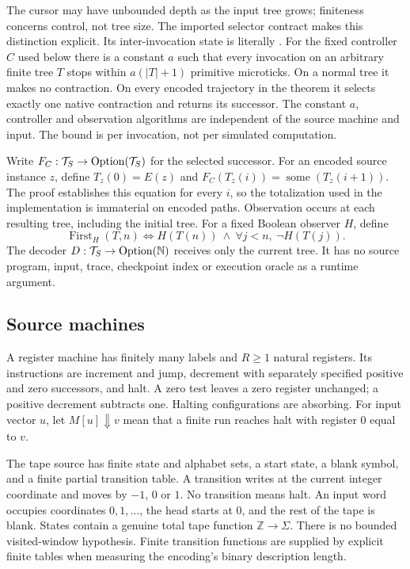 The cursor may have unbounded depth as the input tree grows; finiteness concerns
control, not tree size. The imported selector contract makes this distinction
explicit. Its inter-invocation state is literally . For the fixed
controller $C$ used below there is a constant $a$ such that every invocation on
an arbitrary finite tree $T$ stops within $a(|T|+1)$ primitive microticks. On a
normal tree it makes no contraction. On every encoded trajectory in the theorem
it selects exactly one native contraction and returns its successor. The
constant $a$, controller and observation algorithms are independent of the
source machine and input. The bound is per invocation, not per simulated
computation.

Write $F_C:\mathcal{T}_{S}\to\operatorname{Option}(\mathcal{T}_{S})$ for the selected successor.
For an encoded source instance $z$, define $T_z(0)=E(z)$ and
$F_C(T_z(i))=\operatorname{some}(T_z(i+1))$. The proof establishes this equation
for every $i$, so the totalization used in the implementation is immaterial
on encoded paths. Observation occurs at each resulting tree, including the
initial tree. For a fixed Boolean observer $H$, define
\[
 \operatorname{First}_H(T,n)\iff H(T(n))\ \land\
        \forall j<n,\ \neg H(T(j)).
\]
The decoder $D:\mathcal{T}_{S}\to\operatorname{Option}(\mathbb{N})$ receives only the current
tree. It has no source program, input, trace, checkpoint index or execution
oracle as a runtime argument.

\subsection{Source machines}
A register machine has finitely many labels and $R\geq1$ natural registers.
Its instructions are increment and jump, decrement with separately specified positive
and zero successors, and halt. A zero test leaves a zero register unchanged;
a positive decrement subtracts one. Halting configurations are absorbing.
For input vector $u$, let $M[u]\Downarrow v$ mean that a finite run reaches
halt with register 0 equal to $v$.

The tape source has finite state and alphabet sets, a start state, a blank
symbol, and a finite partial transition table. A transition writes at the
current integer coordinate and moves by $-1$, $0$ or $1$. No transition means
halt. An input word occupies coordinates $0,1,\ldots$, the head starts at $0$,
and the rest of the tape is blank. States contain a genuine total tape
function $\mathbb Z\to\Sigma$. There is no bounded visited-window hypothesis.
Finite transition functions are supplied by explicit finite tables when
measuring the encoding's binary description length.

